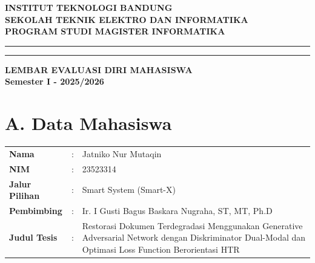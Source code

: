 \documentclass[a4paper,11pt]{article}
\begin{document}
\begin{center}
    \textbf{\large INSTITUT TEKNOLOGI BANDUNG}\\
    \textbf{\large SEKOLAH TEKNIK ELEKTRO DAN INFORMATIKA}\\
    \textbf{PROGRAM STUDI MAGISTER INFORMATIKA}\\
    \vspace{0.2cm}
    \hrule height 1pt
    \vspace{0.1cm}
    \hrule height 0.5pt
    \vspace{0.5cm}
    \textbf{\large LEMBAR EVALUASI DIRI MAHASISWA}\\
    \textbf{Semester I - 2025/2026} %
\end{center}
\vspace{0.5cm}

\section*{A. Data Mahasiswa}
\begin{table}[h!]
    \renewcommand{\arraystretch}{1.3}
    \begin{tabular}{L{4cm} L{0.5cm} L{10cm}}
        \textbf{Nama} & : & Jatniko Nur Mutaqin \\
        \textbf{NIM} & : & 23523314 \\
        \textbf{Jalur Pilihan} & : & Smart System (Smart-X) \\
        \textbf{Pembimbing} & : & Ir. I Gusti Bagus Baskara Nugraha, ST, MT, Ph.D \\
        \textbf{Judul Tesis} & : & Restorasi Dokumen Terdegradasi Menggunakan Generative Adversarial Network dengan Diskriminator Dual-Modal dan Optimasi Loss Function Berorientasi HTR
    \end{tabular}
\end{table}

\end{document}
